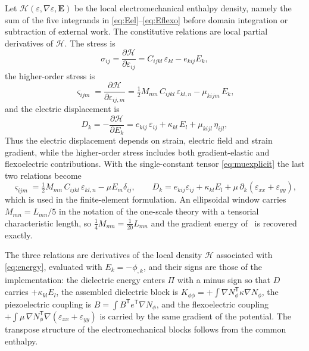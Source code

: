Let $\mathcal H(\varepsilon,\nabla\varepsilon,\bm E)$ be the local
electromechanical enthalpy density, namely the sum of the five integrands
in \eqref{eq:Eel}--\eqref{eq:Eflexo} before domain integration or
subtraction of external work. The constitutive relations are local partial
derivatives of $\mathcal H$. The stress is
\begin{equation}
  \sigma_{ij} = \frac{\partial \mathcal H}{\partial \varepsilon_{ij}}
              = C_{ijkl}\,\varepsilon_{kl} - e_{kij} E_k ,
  \label{eq:sig}
\end{equation}
the higher-order stress is
\begin{equation}
  \varsigma_{ijm} = \frac{\partial \mathcal H}{\partial \varepsilon_{ij,m}}
              = \tfrac12 M_{mn}\,C_{ijkl}\,\varepsilon_{kl,n}
                - \mu_{kijm}\,E_k ,
  \label{eq:tau}
\end{equation}
and the electric displacement is
\begin{equation}
  D_k = -\frac{\partial \mathcal H}{\partial E_k}
              = e_{kij}\,\varepsilon_{ij} + \kappa_{kl}\,E_l
                + \mu_{kijl}\,\eta_{ijl},
  \label{eq:D}
\end{equation}
Thus the electric displacement depends on strain, electric field and
strain gradient, while the higher-order stress includes both gradient-elastic
and flexoelectric contributions. With the single-constant tensor \eqref{eq:muexplicit} the last two
relations become
\begin{equation}
  \varsigma_{ijm} = \tfrac12 M_{mn}\,C_{ijkl}\,\varepsilon_{kl,n}
                    - \mu E_m\delta_{ij},
  \qquad
  D_k = e_{kij}\varepsilon_{ij} + \kappa_{kl}E_l
        + \mu\,\partial_k\left(\varepsilon_{xx}+\varepsilon_{yy}\right),
  \label{eq:Dexplicit}
\end{equation}
which is used in the finite-element formulation. An ellipsoidal window carries
$M_{mn}=L_{mn}/5$ in the notation of the one-scale theory with a tensorial
characteristic length, so $\tfrac14 M_{mn}=\tfrac1{20}L_{mn}$ and the gradient
energy of~\cite{fem1} is recovered exactly.

The three relations are derivatives of the local density $\mathcal H$
associated with \eqref{eq:energy}, evaluated with $E_k=-\phi_{,k}$, and their signs are those of the implementation: the
dielectric energy enters $\Pi$ with a minus sign so that $D$ carries
$+\kappa_{kl}E_l$, the assembled dielectric block is
$K_{\phi\phi}=+\int\nabla N_\phi^{\mathsf T}\kappa\nabla N_\phi$, the
piezoelectric coupling is $B=\int B^{\mathsf T}e^{\mathsf T}\nabla N_\phi$, and
the flexoelectric coupling $+\int\mu\,\nabla N_\phi^{\mathsf T}
\nabla(\varepsilon_{xx}+\varepsilon_{yy})$ is carried by the same gradient of
the potential. The transpose structure of the electromechanical blocks follows from
the common enthalpy.

